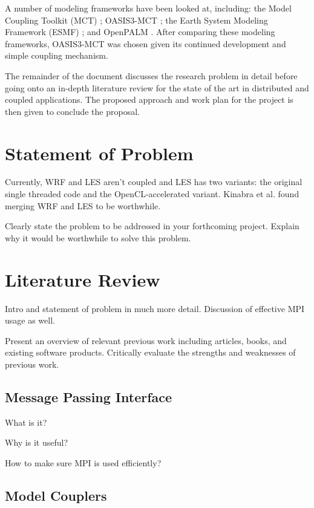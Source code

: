 \documentclass{acm_proc_article-sp}
\begin{document}
A number of modeling frameworks have been looked at, including: the Model
Coupling Toolkit (MCT) \cite{Larson2005}; OASIS3-MCT \cite{Valcke,Valcke2013};
the Earth System Modeling Framework (ESMF) \cite{Ramework2004}; and OpenPALM
\cite{Piacentini2011}. After comparing these modeling frameworks, OASIS3-MCT was
chosen given its continued development and simple coupling mechanism.

The remainder of the document discusses the research problem in detail before
going onto an in-depth literature review for the state of the art in distributed
and coupled applications. The proposed approach and work plan for the project is
then given to conclude the proposal.

\section*{Statement of Problem}

Currently, WRF and LES aren't coupled and LES has two variants: the original
single threaded code and the OpenCL-accelerated variant. Kinabra et al.
\cite{Kinbara2010} found merging WRF and LES to be worthwhile.

Clearly state the problem to be addressed in your forthcoming project. Explain
why it would be worthwhile to solve this problem.

\section*{Literature Review}

Intro and statement of problem in much more detail. Discussion of effective MPI
usage as well.

Present an overview of relevant previous work including articles, books, and
existing software products. Critically evaluate the strengths and weaknesses of
previous work.

\subsection*{Message Passing Interface}

What is it?

Why is it useful?

How to make sure MPI is used efficiently?

\subsection*{Model Couplers}
\end{document}
